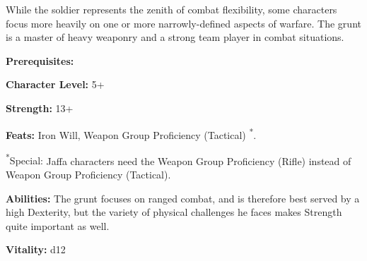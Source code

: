 \begin{multicols}{2}

While the soldier represents the zenith of combat flexibility, some characters focus more heavily on one or more narrowly-defined aspects of warfare. The grunt is a master of heavy weaponry and a strong team player in combat situations.

\columnbreak

\textbf{Prerequisites:} 
\begin{description*}
\item[\hspace{1.5cm}\textbf{Character Level:}] 5+
\item[\hspace{1.5cm}\textbf{Strength:}] 13+
\item[\hspace{1.5cm}\textbf{Feats:}] Iron Will, Weapon Group Proficiency (Tactical) \textsuperscript{*}.
\item[\hspace{1.5cm}\textsuperscript{*}Special:] Jaffa characters need the Weapon Group Proficiency (Rifle) instead of Weapon Group Proficiency (Tactical).
\end{description*}

\textbf{Abilities:} The grunt focuses on ranged combat, and is therefore best served by a high Dexterity, but the variety of physical challenges he faces makes Strength quite important as well.

\textbf{Vitality:} d12

\end{multicols}

\setlength{\intextsep}{-4cm}

